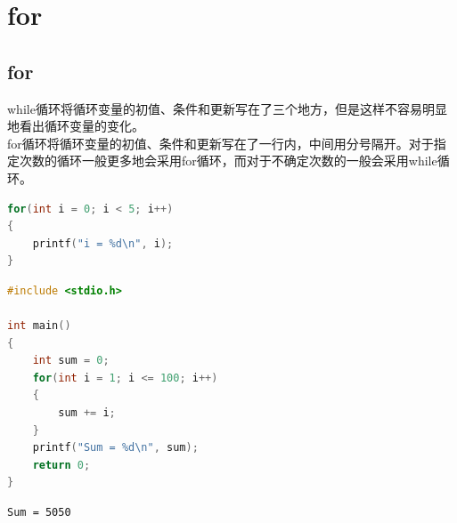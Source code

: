 \newpage

\section{for}

\subsection{for}

while循环将循环变量的初值、条件和更新写在了三个地方，但是这样不容易明显地看出循环变量的变化。\\

for循环将循环变量的初值、条件和更新写在了一行内，中间用分号隔开。对于指定次数的循环一般更多地会采用for循环，而对于不确定次数的一般会采用while循环。

\vspace{-0.5cm}

\begin{lstlisting}[language=C]
for(int i = 0; i < 5; i++)
{
    printf("i = %d\n", i);
}
\end{lstlisting}

\vspace{0.5cm}


\begin{lstlisting}[language=C]
#include <stdio.h>

int main()
{
    int sum = 0;
    for(int i = 1; i <= 100; i++)
    {
        sum += i;
    }
    printf("Sum = %d\n", sum);
    return 0;
}
\end{lstlisting}

\begin{tcolorbox}
    \begin{verbatim}
Sum = 5050
\end{verbatim}
\end{tcolorbox}

\vspace{0.5cm}


